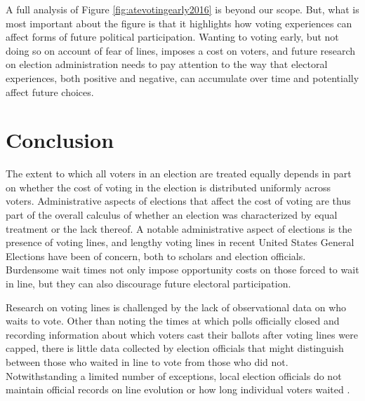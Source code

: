 \documentclass[12pt,titlepage]{article}
\begin{document}
A full analysis of Figure \ref{fig:atevotingearly2016} is beyond our
scope.  But, what is most important about the figure is that it 
highlights how voting experiences can affect forms of future political
participation.  Wanting to voting early, but not doing so on account
of fear of lines, imposes a cost on voters, and future research on
election administration needs to pay attention to the way that
electoral experiences, both positive and negative, can accumulate over
time and potentially affect future choices. 




\section*{Conclusion}

The extent to which all voters in an election are treated equally
depends in part on whether the cost of voting in the election is
distributed uniformly across voters. Administrative aspects of
elections that affect the cost of voting are thus part of the overall
calculus of whether an election was characterized by equal treatment
or the lack thereof.  A notable administrative aspect of elections is
the presence of voting lines, and lengthy voting lines in recent
United States General Elections have been of concern, both to scholars
and election officials.  Burdensome wait times not only impose
opportunity costs on those forced to wait in line, but they can also
discourage future electoral participation.

Research on voting lines is challenged by the lack of observational
data on who waits to vote.  Other than noting the times at which polls
officially closed and recording information about which voters cast
their ballots after voting lines were capped, there is little data
collected by election officials that might distinguish between those
who waited in line to vote from those who did not.  Notwithstanding a
limited number of exceptions, local election officials do not maintain
official records on line evolution or how long individual voters
waited \citep{herron:confidence}.

\end{document}

